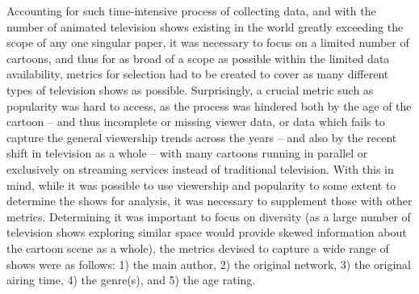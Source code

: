 \documentclass[a4paper, 11pt]{article}
\begin{document}
Accounting for such time-intensive process of collecting data, and with the number of animated television shows existing in the world greatly exceeding the scope of any one singular paper, it was necessary to focus on a limited number of cartoons, and thus for as broad of a scope as possible within the limited data availability, metrics for selection had to be created to cover as many different types of television shows as possible. Surprisingly, a crucial metric such as popularity was hard to access, as the process was hindered both by the age of the cartoon -- and thus incomplete or missing viewer data, or data which fails to capture the general viewership trends across the years -- and also by the recent shift in television as a whole -- with many cartoons running in parallel or exclusively on streaming services instead of traditional television. With this in mind, while it was possible to use viewership and popularity to some extent to determine the shows for analysis, it was necessary to supplement those with other metrics. Determining it was important to focus on diversity (as a large number of television shows exploring similar space would provide skewed information about the cartoon scene as a whole), the metrics devised to capture a wide range of shows were as follows: 1) the main author, 2) the original network, 3) the original airing time, 4) the genre(s), and 5) the age rating.
\end{document}
